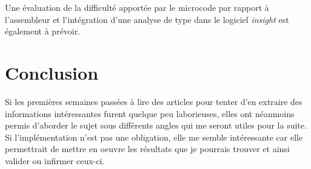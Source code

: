 \documentclass[a4paper,12pt]{article}
\begin{document}
Une évaluation de la
difficulté apportée par le microcode par rapport à l'assembleur et 
l'intégration d'une analyse de type dans le logiciel \textit{insight} est
également à prévoir.

\section{Conclusion}

Si les premières semaines passées à lire des articles pour tenter
d'en extraire des informations intéressantes furent quelque peu 
laborieuses, elles ont néanmoins permis d'aborder le sujet sous différents
angles qui me seront utiles pour la suite. Si l'implémentation n'est pas
une obligation, elle me semble intéressante car elle permettrait de mettre
en oeuvre les résultats que je pourrais trouver et ainsi valider ou infirmer
ceux-ci. 
\end{document}
